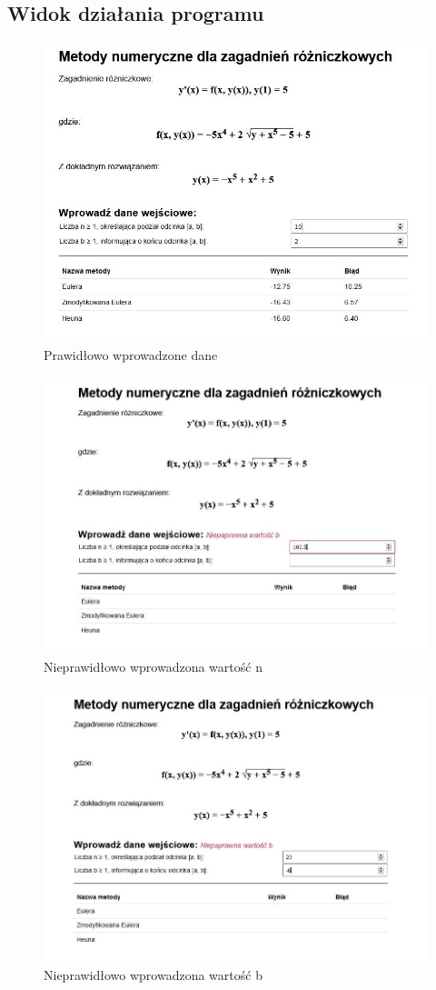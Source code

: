 \documentclass[12pt]{article}
\begin{document}
\subsection{Widok działania programu}
\begin{figure}[h]
\centering
\includegraphics[scale=0.65]{correctData.jpg}
\caption{Prawidłowo wprowadzone dane}
\end{figure}

\begin{figure}
\centering
\includegraphics[scale=0.65]{wrongData.jpg}
\caption{Nieprawidłowo wprowadzona wartość n}
\end{figure}

\begin{figure}
\centering
\includegraphics[scale=0.65]{wrongData2.jpg}
\caption{Nieprawidłowo wprowadzona wartość b}
\end{figure}
\end{document}

